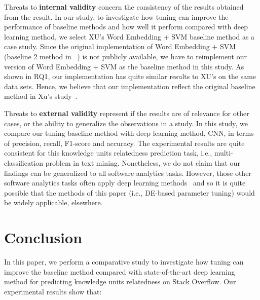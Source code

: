 \documentclass[sigconf,review, anonymous]{acmart}
\theoremstyle{break}
\begin{document}
Threats to \textbf{internal validity} concern the consistency of the results 
obtained from the result. In our study,  to investigate how
tuning can improve the performance of baseline methods and how well
it perform compared with deep learning method, we select
XU's  Word Embedding + SVM baseline method as a case study. Since the original implementation of 
Word Embedding + SVM (baseline 2 method in ~\cite{xu2016predicting}) is not 
publicly available, we have to reimplement our version of Word Embedding + SVM as
the baseline method in this study. As shown in RQ1, our implementation has
quite similar results to XU's on the same data sets. Hence, we believe that our implementation reflect the original
 baseline method in Xu's study~\cite{xu2016predicting}. 
 
 

 
 
 Threats to \textbf{external validity} represent if the results are of relevance for
 other cases, or the ability to generalize the observations in a study. In this study,
 we compare our tuning baseline method with deep learning method, CNN, in terms of
 precision, recall, F1-score and accuracy. The experimental results are quite consistent
 for this knowledge units relatedness prediction task, i.e.,  multi-classification problem in text mining. 
 Nonetheless, we do not claim that our findings can be generalized to all software analytics tasks. 
 However, those other software analytics tasks often apply deep learning
 methods~\cite{choetkiertikul2016deep, wang2016automatically} 
 and so it is quite possible that
 the methods  of this paper (i.e., DE-based parameter tuning) would
 be widely applicable, elsewhere.
 
 


\section{Conclusion}\label{conclusion}

In this paper, we perform a comparative study to investigate
how tuning can improve the baseline method compared with
 state-of-the-art deep learning method  for predicting
knowledge units relatedness on Stack Overflow. Our experimental
results show that:
\end{document}
